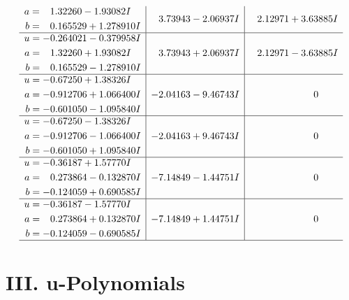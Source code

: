 \documentclass[1p]{elsarticle_modified}
\theoremstyle{definition}
\begin{document}
$$\begin{array}{c|c|c}
\begin{aligned}
a &= \phantom{-}1.32260 - 1.93082 I \\
b &= \phantom{-}0.165529 + 1.278910 I\end{aligned}
 & \phantom{-}3.73943 - 2.06937 I & \phantom{-}2.12971 + 3.63885 I \\ \hline\begin{aligned}
u &= -0.264021 - 0.379958 I \\
a &= \phantom{-}1.32260 + 1.93082 I \\
b &= \phantom{-}0.165529 - 1.278910 I\end{aligned}
 & \phantom{-}3.73943 + 2.06937 I & \phantom{-}2.12971 - 3.63885 I \\ \hline\begin{aligned}
u &= -0.67250 + 1.38326 I \\
a &= -0.912706 + 1.066400 I \\
b &= -0.601050 - 1.095840 I\end{aligned}
 & -2.04163 - 9.46743 I & \phantom{-0.000000 } 0 \\ \hline\begin{aligned}
u &= -0.67250 - 1.38326 I \\
a &= -0.912706 - 1.066400 I \\
b &= -0.601050 + 1.095840 I\end{aligned}
 & -2.04163 + 9.46743 I & \phantom{-0.000000 } 0 \\ \hline\begin{aligned}
u &= -0.36187 + 1.57770 I \\
a &= \phantom{-}0.273864 - 0.132870 I \\
b &= -0.124059 + 0.690585 I\end{aligned}
 & -7.14849 - 1.44751 I & \phantom{-0.000000 } 0 \\ \hline\begin{aligned}
u &= -0.36187 - 1.57770 I \\
a &= \phantom{-}0.273864 + 0.132870 I \\
b &= -0.124059 - 0.690585 I\end{aligned}
 & -7.14849 + 1.44751 I & \phantom{-0.000000 } 0\\
 \hline 
 \end{array}$$\newpage
\newpage\renewcommand{\arraystretch}{1}
\centering \section*{ III. u-Polynomials}
\end{document}
